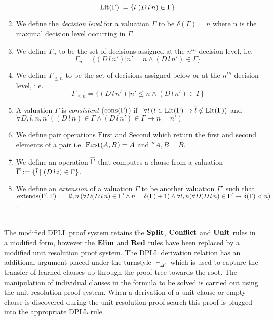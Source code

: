 \begin{mydef}
\begin{enumerate}
	 $$ \mathrm{Lit}(\Gamma) := \{l | (D \, l \, n) \in \Gamma\}$$
%
%
%
\item We define the \emph{decision level} for a valuation $\Gamma$ to be $\delta (\Gamma) = n$ where n is the maximal decision level occurring in $\Gamma$.
%
\item We define $\Gamma_{n}$ to be the set of  decisions assigned at the $n^{th}$ decision level, i.e. 
	$$\Gamma_{n} = \{(D \, l \, n') | n' = n  \wedge (D \, l \, n') \in \Gamma \}$$
%
\item We define $\Gamma_{\leq n}$ to be the set of decisions assigned below or at the $n^{th}$ decision level, i.e. 
	$$\Gamma_{\leq n} = \{( D \, l \, n') | n' \leq n \wedge (D \, l \, n') \in \Gamma \}$$
%
\item A valuation $\Gamma$ is \emph{consistent} ($\mathrm{cons}(\Gamma)$) if \, 
%
$\forall l \,( l \in \mathrm{Lit}(\Gamma) \to \overline{l} \notin \mathrm{Lit}(\Gamma))$
%
 and 
%
$\forall D,l,n,n'( (D \, l \, n) \in \Gamma \wedge (D \, l \, n') \in \Gamma \to n = n')$
%
%
%
\item We define pair operations $\mathrm{First}$ and $\mathrm{Second}$ which return the first and second elements of a pair i.e. $\mathrm{First}(A,B) = A$ and $\second{A,B} = B$.
%
\item We define an operation $\overline{\Gamma}$ that computes a clause from a valuation $\overline{\Gamma} := \{ \overline{l}\, | \, \, (D \, l \, i) \in \Gamma \}$.
%
\item We define an \emph{extension} of a valuation $\Gamma$ to be another valuation $\Gamma'$ such that $\mathrm{extends(\Gamma',\Gamma)} :=  \exists l,n \, ( \forall D (D \, l \, n) \in \Gamma' \wedge n  = \delta(\Gamma) + 1) \wedge \forall l,n ( \forall D (D \, l \, n) \in \Gamma' \to  \delta(\Gamma) < n)$.

\end{enumerate}
\end{mydef}
\hspace{1mm} \\
%
The modified DPLL proof system retains the $\mathbf{Split}$, $\mathbf{Conflict}$ and $\mathbf{Unit}$ rules in a modified form, however the $\mathbf{Elim}$ and $\mathbf{Red}$ rules have been replaced by a modified unit resolution proof system. The DPLL derivation relation has an additional argument placed under the turnstyle $\vdash_{\Delta'}$ which is used to capture the transfer of learned clauses up through the proof tree towards the root. The manipulation of individual clauses in the formula to be solved is carried out using the unit resolution proof system. When a derivation of a unit clause or empty clause is discovered during the unit resolution proof search this proof is plugged into the appropriate DPLL rule. \\
